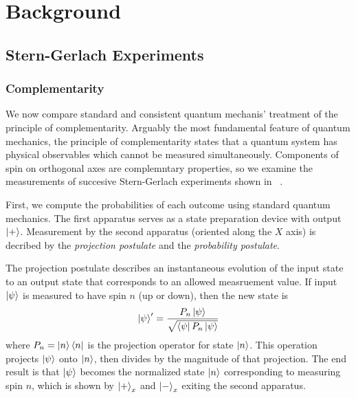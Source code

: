 \usetikzlibrary{shapes.geometric}
\usetikzlibrary{positioning}

\newcommand{\apparatus}[4]{\node[square node] (#1) at (#2,#3){#4};
                           \node[port] (#1+) at (#2 + 0.375, #3 + 0.5){+};
                           \node[port] (#1-) at (#2 + 0.375, #3 - 0.5){-};}

\part{Background}
\chapter{Stern-Gerlach Experiments}

\section{Complementarity}

We now compare standard and consistent quantum mechanis' treatment of the principle of complementarity. Arguably the most fundamental feature of quantum mechanics, the principle of complementarity states that a quantum system has physical observables which cannot be measured simultaneously. Components of spin on orthogonal axes are complemntary properties, so we examine the measurements of succesive Stern-Gerlach experiments shown in \Figure~.

First, we compute the probabilities of each outcome using standard quantum mechanics. The first apparatus serves as a state preparation device with output $\ket{+}$. Measurement by the second apparatus (oriented along the $X$ axis) is decribed by the \textit{projection postulate} and the \textit{probability postulate}.

The projection postulate describes an instantaneous evolution of the input state to an output state that corresponds to an allowed measruement value. If input $\ket{\psi}$ is measured to have spin $n$ (up or down), then the new state is
\begin{align}
    \ket{\psi}^\prime = \frac{P_n\ket{\psi}}{\sqrt{\bra{\psi}P_n\ket{\psi}
    }}
\end{align}
where $P_n = \ket{n}\bra{n}$ is the projection operator for state $\ket{n}$. This operation projects $\ket{\psi}$ onto $\ket{n}$, then divides by the magnitude of that projection. The end result is that $\ket{\psi}$ becomes the normalized state $\ket{n}$ corresponding to measuring spin $n$, which is shown by $\ket{+}_x$ and $\ket{-}_x$ exiting the second apparatus.

